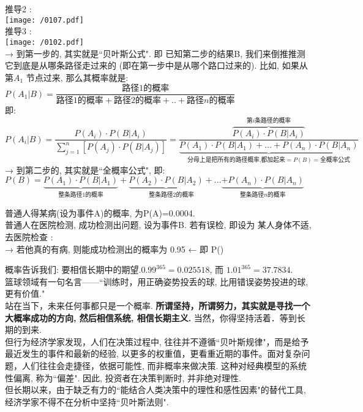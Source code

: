 \documentclass[UTF8]{ctexart}
\begin{document}
推导2 : \\
\texttt{[image: /0107.pdf]} \\




推导3 : \\
\texttt{[image: /0102.pdf]} \\

→ 到第一步的, 其实就是``贝叶斯公式". 即 已知第二步的结果B, 我们来倒推推测它到底是从哪条路径走过来的 (即在第一步中是从哪个路口过来的). 比如, 如果从第$ A_1$ 节点过来, 那么其概率就是:$
P\left( A_1|B \right) =\dfrac{\text{路径1的概率}}{\text{路径1的概率}+\text{路径2的概率}+..+\text{路径}n\text{的概率}}
$ \\
即: \\
$
P\left( A_i|B \right) =\dfrac{P(A_i)\cdot P(B|A_i)}{\sum_{j=1}^n{\left[ P(A_j)\cdot P(B|A_j) \right]}}=\dfrac{\overset{\text{第}i\text{条路径的概率}}{\overbrace{P(A_i)\cdot P(B|A_i)}}}{\underset{\text{分母上是把所有的路径概率,都加起来}=P(B)=\text{全概率公式}}{\underbrace{P(A_1)\cdot P(B|A_1)+...+P(A_n)\cdot P(B|A_n)}}}
$ \\

→ 到第二步的, 其实就是``全概率公式", 即: \\
$
P(B)=\underset{\text{整条路径1的概率}}{\underbrace{P(A_1)\cdot P(B|A_1)}}+\underset{\text{整条路径2的概率}}{\underbrace{P(A_2)\cdot P(B|A_2)}+}...\underset{\text{整条路径}n\text{的概率}}{\underbrace{+P(A_n)\cdot P(B|A_n)}}
$ \\


\begin{myEnvSample}
	普通人得某病(设为事件A)的概率, 为P(A)=0.0004. \\
	普通人在医院检测, 成功检测出问题, 设为事件B. 若有误检, 即设为
	某人身体不适, 去医院检查 : \\
	→ 若他真的有病, 则能成功检测出的概率为 0.95 ← 即 P()
\end{myEnvSample}









概率告诉我们: 要相信长期中的期望.$0.99^{365}=0.025518$, 而 $ 1.01^{365}=37.7834$.   \\
篮球领域有一句名言——``训练时，用正确姿势投丢的球, 比用错误姿势投进的球, 更有价值." \\
站在当下，未来任何事都只是一个概率. \textbf{所谓坚持，所谓努力，其实就是寻找一个大概率成功的方向, 然后相信系统, 相信长期主义.} 当然，你得坚持活着．等到长期的到来.  \\

但行为经济学家发现，人们在决策过程中, 往往并不遵循``贝叶斯规律"，而是给予最近发生的事件和最新的经验, 以更多的权重值，更看重近期的事件。面对复杂问题，人们往往会走捷径，依据可能性, 而非概率来做决策. 这种对经典模型的系统性偏离, 称为``偏差". 因此, 投资者在决策判断时, 并非绝对理性.  \\
但长期以来，由于缺乏有力的``能结合人类决策中的理性和感性因素"的替代工具, 经济学家不得不在分析中坚持``贝叶斯法则".

















	
	
	
\end{document}
